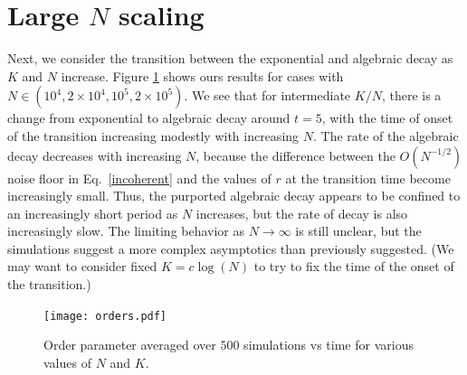 \documentclass[aps,pre,amsmath,amssymb,floatfix,onecolumn,notitlepage,10pt]{revtex4-1}
\begin{document}
\section{Large $N$ scaling}
Next, we consider the transition between the exponential and algebraic decay as $K$ and $N$ increase. Figure \ref{fig3} shows ours results for cases with $N\in(10^4, 2\times 10^4, 10^5,2\times10^5)$. We see that for intermediate $K/N$, there is a change from exponential to algebraic decay around $t=5$, with the time of onset of the transition increasing modestly with increasing $N$.  The rate of the algebraic decay decreases with increasing $N$, because the difference between the $O(N^{-1/2})$ noise floor in Eq.~\eqref{incoherent} and the values of $r$ at the transition time become increasingly small. Thus, the purported algebraic decay appears to be confined to an increasingly short period as $N$ increases, but the rate of decay is also increasingly slow. The limiting behavior as $N\to\infty$ is still unclear, but the simulations suggest a more complex asymptotics than previously suggested. (We may want to consider fixed $K=c\log(N)$ to try to fix the time of the onset of the transition.)
\begin{figure}[hbt]
\texttt{[image: orders.pdf]}
\caption{Order parameter averaged over $500$ simulations vs time for various values of $N$ and $K$. \label{fig3}}
\end{figure} 
\clearpage
\end{document}
